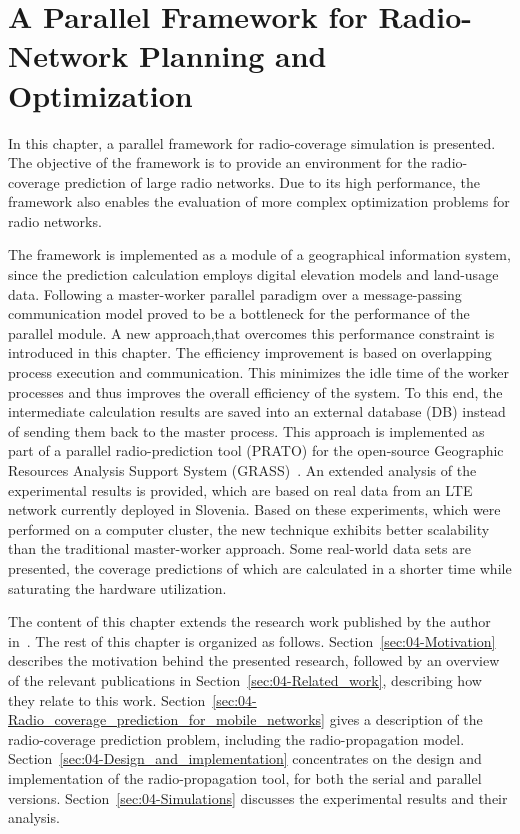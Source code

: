 
\chapter{A Parallel Framework for Radio-Network Planning and Optimization
\label{chap:04-Framework-design-and-implementation}}


In this chapter, a parallel framework for radio-coverage simulation
is presented. The objective of the framework is to provide an environment
for the radio-coverage prediction of large radio networks. Due to
its high performance, the framework also enables the evaluation of
more complex optimization problems for radio networks. 

The framework is implemented as a module of a geographical information
system, since the prediction calculation employs digital elevation
models and land-usage data. Following a master-worker parallel paradigm
over a message-passing communication model proved to be a bottleneck
for the performance of the parallel module. A new approach,that overcomes
this performance constraint is introduced in this chapter. The efficiency
improvement is based on overlapping process execution and communication.
This minimizes the idle time of the worker processes and thus improves
the overall efficiency of the system. To this end, the intermediate
calculation results are saved into an external database (DB)
instead of sending them back to the master process. This approach
is implemented as part of a parallel radio-prediction tool (PRATO)
for the open-source Geographic Resources Analysis Support System (GRASS)~\cite{Neteler_Open_source_GIS_a_GRASS_GIS_approach}.
An extended analysis of the experimental results is provided, which
are based on real data from an LTE network currently deployed in Slovenia.
Based on these experiments, which were performed on a computer cluster,
the new technique exhibits better scalability than the traditional
master-worker approach. Some real-world data sets are presented, the
coverage predictions of which are calculated in a shorter time while
saturating the hardware utilization.

The content of this chapter extends the research work published by
the author in~\cite{Benedicic-A_GRASS_GIS_parallel_module_for_radio-propagation_predictions:2013}.
The rest of this chapter is organized as follows. Section~\ref{sec:04-Motivation}
describes the motivation behind the presented research, followed by
an overview of the relevant publications in Section~\ref{sec:04-Related_work},
describing how they relate to this work. Section~\ref{sec:04-Radio_coverage_prediction_for_mobile_networks}
gives a description of the radio-coverage prediction problem, including
the radio-propagation model. Section~\ref{sec:04-Design_and_implementation}
concentrates on the design and implementation of the radio-propagation
tool, for both the serial and parallel versions. Section~\ref{sec:04-Simulations}
discusses the experimental results and their analysis.


